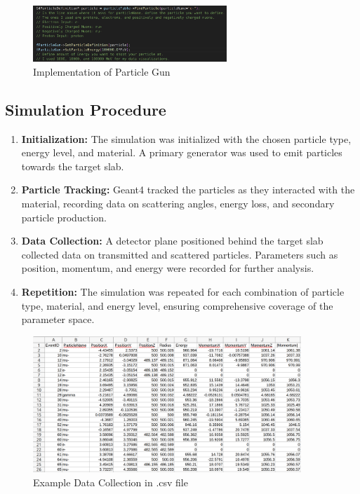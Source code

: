 \documentclass{article}
\begin{document}
\begin{figure}[H]
\centering
\includegraphics[width=0.65\textwidth]{Screenshot from 2024-07-31 20-43-33.png}
\caption{Implementation of Particle Gun}
\end{figure}

\subsection{Simulation Procedure}

\begin{enumerate}
    \item \textbf{Initialization:} The simulation was initialized with the chosen particle type, energy level, and material. A primary generator was used to emit particles towards the target slab.

    \item \textbf{Particle Tracking:} Geant4 tracked the particles as they interacted with the material, recording data on scattering angles, energy loss, and secondary particle production.

    \item \textbf{Data Collection:} A detector plane positioned behind the target slab collected data on transmitted and scattered particles. Parameters such as position, momentum, and energy were recorded for further analysis.

    \item \textbf{Repetition:} The simulation was repeated for each combination of particle type, material, and energy level, ensuring comprehensive coverage of the parameter space.
\end{enumerate}

\begin{figure}[H]
\centering
\includegraphics[width=0.9\textwidth]{Screenshot from 2024-08-02 13-05-09.png}
\caption{Example Data Collection in .csv file}
\end{figure}
\end{document}

